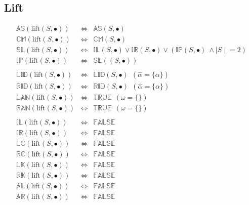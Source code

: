 \documentclass[10pt]{report}
\newcommand{\propname}[1]{{\mathbb{#1}}}
\begin{document}
\subsection{Lift} 
\[
\begin{array}{rcl} 
\propname{AS}(\mathrm{lift}(S, \bullet)) 
   & \Leftrightarrow 
   & \propname{AS}(S, \bullet) \\ 
\propname{CM}(\mathrm{lift}(S, \bullet)) 
   & \Leftrightarrow 
   & \propname{CM}(S, \bullet) \\ 
\propname{SL}(\mathrm{lift}(S, \bullet)) 
   & \Leftrightarrow 
   & \propname{IL}(S, \bullet) 
     \vee \propname{IR}(S, \bullet) 
     \vee (\propname{IP}(S, \bullet)\ \wedge {\mid S \mid} = 2) \\ 
\propname{IP}(\mathrm{lift}(S, \bullet)) 
   & \Leftrightarrow 
   & \propname{SL}((S, \bullet)) \\ \\
   
\propname{LID}(\mathrm{lift}(S, \bullet)) 
   & \Leftrightarrow 
   & \propname{LID}(S, \bullet)  \ \ (\hat{\alpha} = \{\alpha\})\\ 
\propname{RID}(\mathrm{lift}(S, \bullet)) 
   & \Leftrightarrow 
   & \propname{RID}(S, \bullet)  \ \ (\hat{\alpha} = \{\alpha\})\\ 
\propname{LAN}(\mathrm{lift}(S, \bullet)) 
   & \Leftrightarrow 
   & \propname{TRUE} \ \ (\omega = \{\})\\ 
\propname{RAN}(\mathrm{lift}(S, \bullet)) 
   & \Leftrightarrow 
   & \propname{TRUE} \ \ (\omega = \{\})\\\\
   
\propname{IL}(\mathrm{lift}(S, \bullet)) 
   & \Leftrightarrow 
   & \propname{FALSE} \\ 
\propname{IR}(\mathrm{lift}(S, \bullet)) 
   & \Leftrightarrow 
   & \propname{FALSE} \\ 
\propname{LC}(\mathrm{lift}(S, \bullet)) 
   & \Leftrightarrow 
   & \propname{FALSE} \\ 
\propname{RC}(\mathrm{lift}(S, \bullet)) 
   & \Leftrightarrow 
   & \propname{FALSE} \\ 
\propname{LK}(\mathrm{lift}(S, \bullet)) 
   & \Leftrightarrow 
   & \propname{FALSE} \\ 
\propname{RK}(\mathrm{lift}(S, \bullet)) 
   & \Leftrightarrow 
   & \propname{FALSE} \\  
\propname{AL}(\mathrm{lift}(S, \bullet))  
   & \Leftrightarrow 
   & \propname{FALSE} \\
\propname{AR}(\mathrm{lift}(S, \bullet))  
   & \Leftrightarrow 
   & \propname{FALSE} \\ 
\end{array} 
\]
\end{document}
